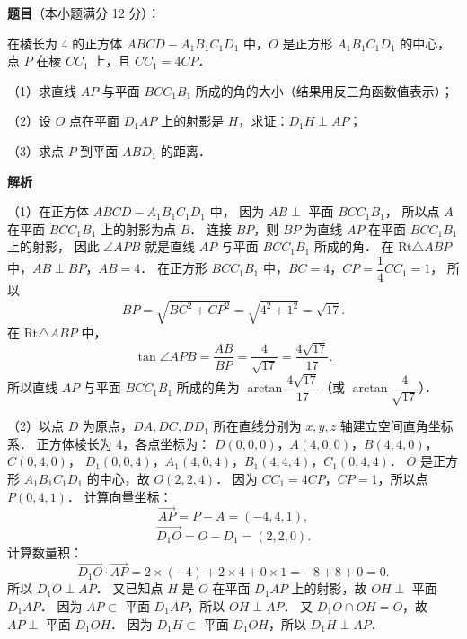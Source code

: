\begin{answer}

\textbf{题目}（本小题满分 12 分）：

在棱长为 4 的正方体 $ABCD - A_1B_1C_1D_1$ 中，$O$ 是正方形 $A_1B_1C_1D_1$ 的中心，点 $P$ 在棱 $CC_1$ 上，且 $CC_1 = 4CP$．

（1）求直线 $AP$ 与平面 $BCC_1B_1$ 所成的角的大小（结果用反三角函数值表示）；

（2）设 $O$ 点在平面 $D_1AP$ 上的射影是 $H$，求证：$D_1H \perp AP$；

（3）求点 $P$ 到平面 $ABD_1$ 的距离．
\nopagebreak[4]
\begin{center}\end{center}
\nopagebreak[4]
\textbf{解析}
\nopagebreak[4]
\begin{center}\end{center}
\nopagebreak[4]
（1）在正方体 $ABCD - A_1B_1C_1D_1$ 中，
因为 $AB \perp$ 平面 $BCC_1B_1$，
所以点 $A$ 在平面 $BCC_1B_1$ 上的射影为点 $B$．
连接 $BP$，则 $BP$ 为直线 $AP$ 在平面 $BCC_1B_1$ 上的射影，
因此 $\angle APB$ 就是直线 $AP$ 与平面 $BCC_1B_1$ 所成的角．
在 Rt$\triangle ABP$ 中，$AB \perp BP$，$AB = 4$．
在正方形 $BCC_1B_1$ 中，$BC = 4$，$CP = \dfrac{1}{4}CC_1 = 1$，
所以
\nopagebreak[4]
\[
BP = \sqrt{BC^2 + CP^2} = \sqrt{4^2 + 1^2} = \sqrt{17}.
\]
在 Rt$\triangle ABP$ 中，
\nopagebreak[4]
\[
\tan\angle APB = \frac{AB}{BP} = \frac{4}{\sqrt{17}} = \frac{4\sqrt{17}}{17}.
\]
所以直线 $AP$ 与平面 $BCC_1B_1$ 所成的角为 $\arctan\dfrac{4\sqrt{17}}{17}$（或 $\arctan\dfrac{4}{\sqrt{17}}$）．

（2）以点 $D$ 为原点，$DA, DC, DD_1$ 所在直线分别为 $x, y, z$ 轴建立空间直角坐标系．
正方体棱长为 4，各点坐标为：
$D(0, 0, 0)$，$A(4, 0, 0)$，$B(4, 4, 0)$，$C(0, 4, 0)$，
$D_1(0, 0, 4)$，$A_1(4, 0, 4)$，$B_1(4, 4, 4)$，$C_1(0, 4, 4)$．
$O$ 是正方形 $A_1B_1C_1D_1$ 的中心，故 $O(2, 2, 4)$．
因为 $CC_1 = 4CP$，$CP = 1$，所以点 $P(0, 4, 1)$．
计算向量坐标：
\nopagebreak[4]
\[
\vec{AP} = P - A = (-4, 4, 1),
\]
\nopagebreak[4]
\[
\vec{D_1O} = O - D_1 = (2, 2, 0).
\]
计算数量积：
\nopagebreak[4]
\[
\vec{D_1O} \cdot \vec{AP} = 2 \times (-4) + 2 \times 4 + 0 \times 1 = -8 + 8 + 0 = 0.
\]
所以 $D_1O \perp AP$．
又已知点 $H$ 是 $O$ 在平面 $D_1AP$ 上的射影，故 $OH \perp$ 平面 $D_1AP$．
因为 $AP \subset$ 平面 $D_1AP$，所以 $OH \perp AP$．
又 $D_1O \cap OH = O$，故 $AP \perp$ 平面 $D_1OH$．
因为 $D_1H \subset$ 平面 $D_1OH$，所以 $D_1H \perp AP$．


\end{answer}
